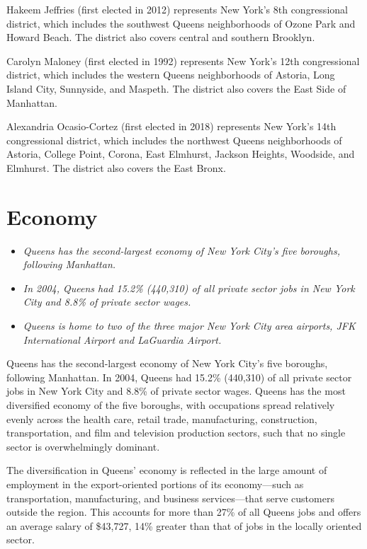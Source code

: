 Hakeem Jeffries (first elected in 2012) represents New York's 8th
congressional district, which includes the southwest Queens
neighborhoods of Ozone Park and Howard Beach. The district also covers
central and southern Brooklyn.

Carolyn Maloney (first elected in 1992) represents New York's 12th
congressional district, which includes the western Queens neighborhoods
of Astoria, Long Island City, Sunnyside, and Maspeth. The district also
covers the East Side of Manhattan.

Alexandria Ocasio-Cortez (first elected in 2018) represents New York's
14th congressional district, which includes the northwest Queens
neighborhoods of Astoria, College Point, Corona, East Elmhurst, Jackson
Heights, Woodside, and Elmhurst. The district also covers the East
Bronx.

\section{Economy}\label{economy}

\begin{itemize}
\item
  \emph{Queens has the second-largest economy of New York City's five
  boroughs, following Manhattan.}
\item
  \emph{In 2004, Queens had 15.2\% (440,310) of all private sector jobs
  in New York City and 8.8\% of private sector wages.}
\item
  \emph{Queens is home to two of the three major New York City area
  airports, JFK International Airport and LaGuardia Airport.}
\end{itemize}

Queens has the second-largest economy of New York City's five boroughs,
following Manhattan. In 2004, Queens had 15.2\% (440,310) of all private
sector jobs in New York City and 8.8\% of private sector wages. Queens
has the most diversified economy of the five boroughs, with occupations
spread relatively evenly across the health care, retail trade,
manufacturing, construction, transportation, and film and television
production sectors, such that no single sector is overwhelmingly
dominant.

The diversification in Queens' economy is reflected in the large amount
of employment in the export-oriented portions of its economy---such as
transportation, manufacturing, and business services---that serve
customers outside the region. This accounts for more than 27\% of all
Queens jobs and offers an average salary of \$43,727, 14\% greater than
that of jobs in the locally oriented sector.

